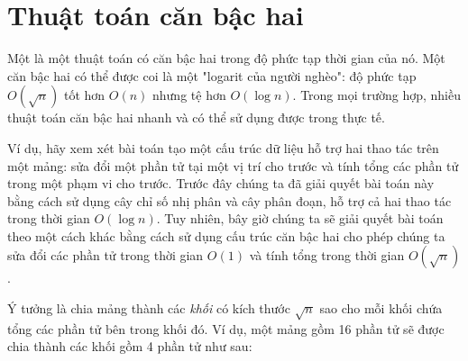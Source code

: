 \chapter{Thuật toán căn bậc hai}


Một  là một thuật toán
có căn bậc hai trong độ phức tạp thời gian của nó.
Một căn bậc hai có thể được coi là một "logarit của người nghèo":
độ phức tạp $O(\sqrt n)$ tốt hơn $O(n)$
nhưng tệ hơn $O(\log n)$.
Trong mọi trường hợp, nhiều thuật toán căn bậc hai nhanh và có thể sử dụng được trong thực tế.

Ví dụ, hãy xem xét bài toán
tạo một cấu trúc dữ liệu hỗ trợ
hai thao tác trên một mảng:
sửa đổi một phần tử tại một vị trí cho trước
và tính tổng các phần tử trong một phạm vi cho trước.
Trước đây chúng ta đã giải quyết bài toán này bằng cách sử dụng
cây chỉ số nhị phân và cây phân đoạn,
hỗ trợ cả hai thao tác trong thời gian $O(\log n)$.
Tuy nhiên, bây giờ chúng ta sẽ giải quyết bài toán
theo một cách khác bằng cách sử dụng cấu trúc căn bậc hai
cho phép chúng ta sửa đổi các phần tử trong thời gian $O(1)$
và tính tổng trong thời gian $O(\sqrt n)$.

Ý tưởng là chia mảng thành các \emph{khối}
có kích thước $\sqrt n$ sao cho mỗi khối chứa
tổng các phần tử bên trong khối đó.
Ví dụ, một mảng gồm 16 phần tử sẽ được
chia thành các khối gồm 4 phần tử như sau:

\begin{center}
\end{center}

